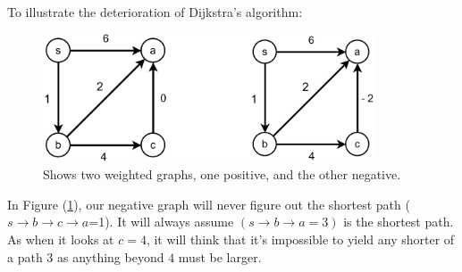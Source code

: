 \newpage

\noindent
To illustrate the deterioration of Dijkstra's algorithm:

\begin{figure}[h]
    \begin{center}
      \includegraphics[height=1.5in]{./Sections/sched/dstra/dstra_neg.png}
    \end{center}
     \caption{Shows two weighted graphs, one positive, and the other negative.}\label{fig:dstra_neg}
\end{figure}

\noindent
In Figure (\ref{fig:dstra_neg}), our negative graph will never figure out the shortest path ($s\to b\to c\to a$=1). It 
will always assume $(s\to b\to a=3)$ is the shortest path. As when it looks at $c=4$, it will think that it's 
impossible to yield any shorter of a path $3$ as anything beyond $4$ must be larger.